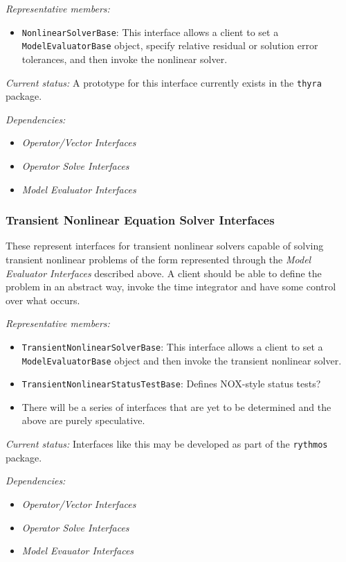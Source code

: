 \documentclass[pdf,ps2pdf,11pt]{SANDreport}
\begin{document}
{}\textit{Representative members:}
\begin{itemize}
%
{}\item {}\texttt{NonlinearSolverBase}: This interface allows a client to set
a {}\texttt{ModelEvaluatorBase} object, specify relative residual or solution
error tolerances, and then invoke the nonlinear solver.
%
\end{itemize}

{}\textit{Current status:} A prototype for this interface currently exists in
the {}\texttt{thyra} package.

{}\textit{Dependencies:}
\begin{itemize}
\item {}\textit{Operator/Vector Interfaces}
\item {}\textit{Operator Solve Interfaces}
\item {}\textit{Model Evaluator Interfaces}
\end{itemize}

%
\subsubsection{Transient Nonlinear Equation Solver Interfaces}
%

These represent interfaces for transient nonlinear solvers capable of solving
transient nonlinear problems of the form represented through the
{}\textit{Model Evaluator Interfaces} described above.  A client should be
able to define the problem in an abstract way, invoke the time integrator and
have some control over what occurs.

{}\textit{Representative members:}
\begin{itemize}
%
{}\item {}\texttt{TransientNonlinearSolverBase}: This interface allows a
client to set a {}\texttt{ModelEvaluatorBase} object and then invoke the
transient nonlinear solver.
%
{}\item {}\texttt{TransientNonlinearStatusTestBase}: Defines NOX-style status tests?
%
{}\item There will be a series of interfaces that are yet to be determined and
the above are purely speculative.
%
\end{itemize}

{}\textit{Current status:} Interfaces like this may be developed as part of
the {}\texttt{rythmos} package.

{}\textit{Dependencies:}
\begin{itemize}
\item {}\textit{Operator/Vector Interfaces}
\item {}\textit{Operator Solve Interfaces}
\item {}\textit{Model Evauator Interfaces}
\end{itemize}
\end{document}
